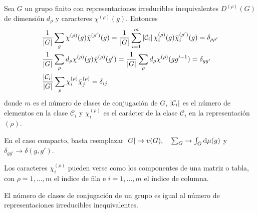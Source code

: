 \begin{relacion}
Sea $G$ un grupo finito con representaciones irreducibles inequivalentes $D^{(\rho)}(G)$ de dimensión $d_\rho$ y caracteres $\chi^{(\rho)}(g)$. Entonces
\begin{subequations}
\begin{flalign}
&\frac{1}{\left\lvert G\right\rvert}\sum_{g} \chi^{(\rho)}(g)\bar{\chi}^{(\rho')}(g)=\frac{1}{\left\lvert G\right\rvert}\sum_{i=1}^m \left\lvert\mathcal{C}_i\right\rvert \chi_i^{(\rho)}(g)\bar{\chi}_i^{(\rho')}(g)=\delta_{\rho\rho'}\\
& \frac{1}{\left\lvert G\right\rvert} \sum_\rho d_\rho \chi^{(\rho)} (g)\bar{\chi}^{(\rho)}(g')=\frac{1}{\left\lvert G\right\rvert} \sum_\rho d_\rho \chi^{(\rho)} (gg^{\prime -1})=\delta_{gg'}\\
&\frac{\left|\mathcal{C}_{i}\right|}{|G|} \sum_{\rho} \chi_{i}^{(\rho)} \bar{\chi}_{j}^{(\rho)}=\delta_{i j}
\end{flalign}
\end{subequations}
donde $m$ es el número de clases de conjugación de $G$, $\left\lvert\mathcal{C}_i\right\rvert$ es el número de elementos en la clase $\mathcal{C}_i$ y $\chi_i^{(\rho)}$ es el carácter de la clase $\mathcal{C}_i$ en la representación $(\rho)$. \medskip

En el caso compacto, basta reemplazar $\left\lvert G\right\rvert\rightarrow v(G),\quad \sum_G\rightarrow \int_G \mathrm{d}\mu(g)$ y $\delta_{gg'}\rightarrow \delta(g,g')$.
\end{relacion}

Los caracteres $\chi_i^{(\rho)}$ pueden verse como los componentes de una matriz o tabla, con $\rho=1,\ldots,m$ el índice de fila e $i=1,\ldots,m$ el índice de columna.

\begin{proposicion}
El número de clases de conjugación de un grupo es igual al número de representaciones irreducibles inequivalentes. 
\end{proposicion}

